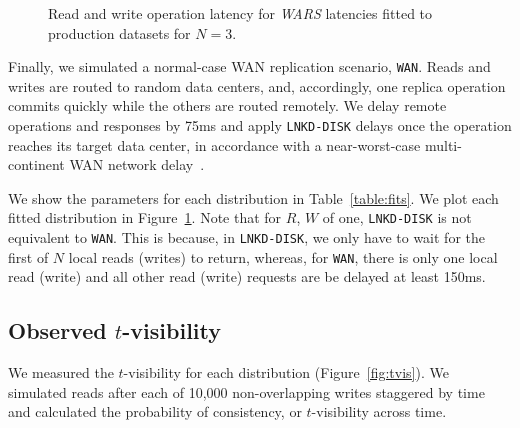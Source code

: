 \documentclass{vldb}
\newcommand{\subsectionskip}{-0em}
\begin{document}
\begin{figure}[t!]
\vspace{-8pt}
\caption{Read and write operation latency for \textit{WARS} latencies fitted
  to production datasets for $N$$=$$3$.}
\vspace{-0pt}
\label{fig:latencies}
\end{figure}

Finally, we simulated a normal-case WAN replication scenario,
\texttt{WAN}.  Reads and writes are routed to random data centers,
and, accordingly, one replica operation commits quickly while the
others are routed remotely.  We delay remote operations and responses
by 75ms and apply \texttt{LNKD-DISK} delays once the operation reaches its
target data center, in accordance with a near-worst-case
multi-continent WAN network delay~\cite{dean-keynote}.

We show the parameters for each distribution in
Table~\ref{table:fits}. We plot each fitted distribution in
Figure~\ref{fig:latencies}.  Note that for $R$, $W$ of one,
\texttt{LNKD-DISK} is not equivalent to \texttt{WAN}.  This is
because, in \texttt{LNKD-DISK}, we only have to wait for the first of
$N$ local reads (writes) to return, whereas, for \texttt{WAN}, there
is only one local read (write) and all other read (write) requests
are be delayed at least 150ms.

\vspace{\subsectionskip}\subsection{Observed {\large$t$}-visibility}

We measured the $t$-visibility for each distribution
(Figure~\ref{fig:tvis}).  We simulated reads
after each of 10,000 non-overlapping writes staggered by time
and calculated the probability of consistency, or 
$t$-visibility across time.
\end{document}
